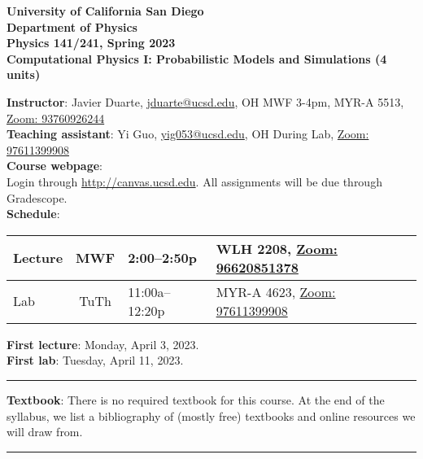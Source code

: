 \documentclass[12pt]{article}
\begin{document}
\begin{center}
  \textbf{
    University of California San Diego\\
    Department of Physics\\
    Physics 141/241, Spring 2023\\
    Computational Physics I: Probabilistic Models and Simulations (4 units)
  }
\end{center}

\noindent\textbf{Instructor}: Javier Duarte, \href{mailto:jduarte@ucsd.edu}{jduarte@ucsd.edu}, OH MWF 3-4pm, MYR-A 5513, \href{https://ucsd.zoom.us/j/93760926244}{Zoom: 93760926244}\\
\noindent \textbf{Teaching assistant}: Yi Guo, \href{mailto:yig053@ucsd.edu}{yig053@ucsd.edu}, OH During Lab, \href{https://ucsd.zoom.us/j/97611399908}{Zoom: 97611399908}\\

\noindent\textbf{Course webpage}:\\
\hspace*{1cm}Login through \href{http://canvas.ucsd.edu}{http://canvas.ucsd.edu}.
All assignments will be due through Gradescope.\\

\noindent\textbf{Schedule}:
\begin{center}
  \begin{tabular}{|l|c|l|m{90mm}|}
    \hline
    Lecture & MWF  & 2:00--2:50p    & WLH 2208, \href{https://ucsd.zoom.us/j/96620851378}{Zoom: 96620851378}   \\\hline
    Lab     & TuTh & 11:00a--12:20p & MYR-A 4623, \href{https://ucsd.zoom.us/j/97611399908}{Zoom: 97611399908} \\\hline\end{tabular}
\end{center}

\noindent\textbf{First lecture}: Monday, April 3, 2023.\\
\textbf{First lab}: Tuesday, April 11, 2023.

\begin{center}
  \rule{\textwidth}{0.5pt}
\end{center}

\noindent\textbf{Textbook}: There is no required textbook for this course.
At the end of the syllabus, we list a bibliography of (mostly free) textbooks and online resources we will draw from.

\begin{center}
  \rule{\textwidth}{0.5pt}
\end{center}
\end{document}
